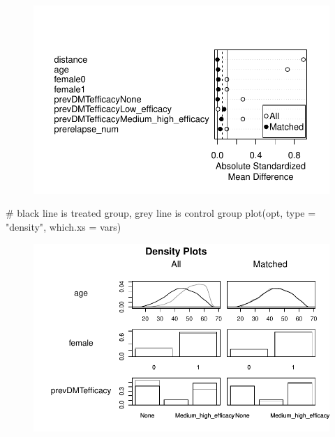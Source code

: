\documentclass[
  letterpaper,
  DIV=11,
  numbers=noendperiod]{scrreprt}
\newenvironment{Shaded}{\begin{snugshade}}{\end{snugshade}}
\newcommand{\AttributeTok}[1]{\textcolor[rgb]{0.40,0.45,0.13}{#1}}
\newcommand{\CommentTok}[1]{\textcolor[rgb]{0.37,0.37,0.37}{#1}}
\newcommand{\FunctionTok}[1]{\textcolor[rgb]{0.28,0.35,0.67}{#1}}
\newcommand{\NormalTok}[1]{\textcolor[rgb]{0.00,0.23,0.31}{#1}}
\newcommand{\StringTok}[1]{\textcolor[rgb]{0.13,0.47,0.30}{#1}}
\begin{document}
\begin{figure}[H]

{\centering \includegraphics{chapter_06_files/figure-pdf/unnamed-chunk-11-1.pdf}

}

\end{figure}

\begin{Shaded}
\begin{Highlighting}[]
\CommentTok{\# black line is treated group, grey line is control group}
\FunctionTok{plot}\NormalTok{(opt, }\AttributeTok{type =} \StringTok{"density"}\NormalTok{, }\AttributeTok{which.xs =}\NormalTok{ vars) }
\end{Highlighting}
\end{Shaded}

\begin{figure}[H]

{\centering \includegraphics{chapter_06_files/figure-pdf/unnamed-chunk-11-2.pdf}

}

\end{figure}
\end{document}
